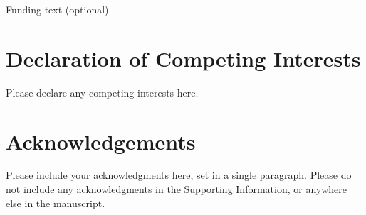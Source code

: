 \documentclass[]{imag-ms-template}
\theoremstyle{plain}
\theoremstyle{remark}
\begin{document}
Funding text (optional).

\section*{Declaration of Competing Interests}

Please declare any competing interests here.

\section*{Acknowledgements}

Please include your acknowledgments here, set in a single paragraph.
Please do not include any acknowledgments in the Supporting Information,
or anywhere else in the manuscript.

\printbibliography
\end{document}
